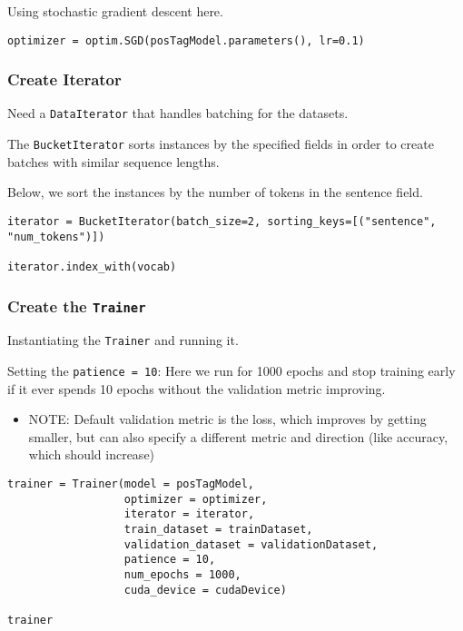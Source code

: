 \documentclass[
]{article}
\providecommand{\tightlist}{%
  \setlength{\itemsep}{0pt}\setlength{\parskip}{0pt}}
\begin{document}
Using stochastic gradient descent here.

\begin{verbatim}
optimizer = optim.SGD(posTagModel.parameters(), lr=0.1)
\end{verbatim}

\hypertarget{create-iterator}{%
\subsubsection{Create Iterator}\label{create-iterator}}

Need a \texttt{DataIterator} that handles batching for the datasets.

The \texttt{BucketIterator} sorts instances by the specified fields in
order to create batches with similar sequence lengths.

Below, we sort the instances by the number of tokens in the sentence
field.

\begin{verbatim}
iterator = BucketIterator(batch_size=2, sorting_keys=[("sentence", "num_tokens")])

iterator.index_with(vocab)
\end{verbatim}

\hypertarget{create-the-trainer}{%
\subsubsection{\texorpdfstring{Create the
\texttt{Trainer}}{Create the Trainer}}\label{create-the-trainer}}

Instantiating the \texttt{Trainer} and running it.

Setting the \texttt{patience\ =\ 10}: Here we run for 1000 epochs and
stop training early if it ever spends 10 epochs without the validation
metric improving.

\begin{itemize}
\tightlist
\item
  NOTE: Default validation metric is the loss, which improves by getting
  smaller, but can also specify a different metric and direction (like
  accuracy, which should increase)
\end{itemize}

\begin{verbatim}
trainer = Trainer(model = posTagModel,
                  optimizer = optimizer,
                  iterator = iterator,
                  train_dataset = trainDataset,
                  validation_dataset = validationDataset,
                  patience = 10,
                  num_epochs = 1000,
                  cuda_device = cudaDevice)

trainer
\end{verbatim}
\end{document}
